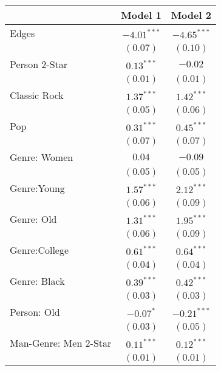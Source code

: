 
\begin{table}
\begin{center}
\begin{tabular}{l c c}
\hline
 & Model 1 & Model 2 \\
\hline
Edges                             & $-4.01^{***}$ & $-4.65^{***}$ \\
                                  & $(0.07)$      & $(0.10)$      \\
Person 2-Star                     & $0.13^{***}$  & $-0.02$       \\
                                  & $(0.01)$      & $(0.01)$      \\
Classic Rock                      & $1.37^{***}$  & $1.42^{***}$  \\
                                  & $(0.05)$      & $(0.06)$      \\
Pop                               & $0.31^{***}$  & $0.45^{***}$  \\
                                  & $(0.07)$      & $(0.07)$      \\
Genre: Women                      & $0.04$        & $-0.09$       \\
                                  & $(0.05)$      & $(0.05)$      \\
Genre:Young                       & $1.57^{***}$  & $2.12^{***}$  \\
                                  & $(0.06)$      & $(0.09)$      \\
Genre: Old                        & $1.31^{***}$  & $1.95^{***}$  \\
                                  & $(0.06)$      & $(0.09)$      \\
Genre:College                     & $0.61^{***}$  & $0.64^{***}$  \\
                                  & $(0.04)$      & $(0.04)$      \\
Genre: Black                      & $0.39^{***}$  & $0.42^{***}$  \\
                                  & $(0.03)$      & $(0.03)$      \\
Person: Old                       & $-0.07^{*}$   & $-0.21^{***}$ \\
                                  & $(0.03)$      & $(0.05)$      \\
Man-Genre: Men 2-Star             & $0.11^{***}$  & $0.12^{***}$  \\
                                  & $(0.01)$      & $(0.01)$      \\

\end{tabular}
\end{center}
\end{table}
